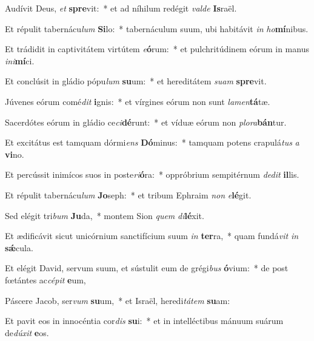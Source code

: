 \item Audívit Deus, \textit{et} \textbf{spre}vit:~* et ad níhilum redégit \textit{val}\textit{de} \textbf{Is}raël.
\item Et répulit tabernácu\textit{lum} \textbf{Si}lo:~* tabernáculum suum, ubi habitávit \textit{in} \textit{ho}\textbf{mí}nibus.
\item Et trádidit in captivitátem virtútem \textit{e}\textbf{ó}rum:~* et pulchritúdinem eórum in manus \textit{in}\textit{i}\textbf{mí}ci.
\item Et conclúsit in gládio pópu\textit{lum} \textbf{su}um:~* et hereditátem \textit{su}\textit{am} \textbf{spre}vit.
\item Júvenes eórum comé\textit{dit} \textbf{i}gnis:~* et vírgines eórum non sunt \textit{la}\textit{men}\textbf{tá}tæ.
\item Sacerdótes eórum in gládio ce\textit{ci}\textbf{dé}runt:~* et víduæ eórum non \textit{plo}\textit{ra}\textbf{bán}tur.
\item Et excitátus est tamquam dórmi\textit{ens} \textbf{Dó}minus:~* tamquam potens crapulá\textit{tus} \textit{a} \textbf{vi}no.
\item Et percússit inimícos suos in poste\textit{ri}\textbf{ó}ra:~* oppróbrium sempitérnum \textit{de}\textit{dit} \textbf{il}lis.
\item Et répulit tabernácu\textit{lum} \textbf{Jo}seph:~* et tribum Ephraim \textit{non} \textit{e}\textbf{lé}git.
\item Sed elégit tri\textit{bum} \textbf{Ju}da,~* montem Sion \textit{quem} \textit{di}\textbf{lé}xit.
\item Et ædificávit sicut unicórnium sanctifícium suum \textit{in} \textbf{ter}ra,~* quam fundá\textit{vit} \textit{in} \textbf{sǽ}cula.
\item Et elégit David, servum suum, et sústulit eum de grégi\textit{bus} \textbf{ó}vium:~* de post fœtántes ac\textit{cé}\textit{pit} \textbf{e}um,
\item Páscere Jacob, ser\textit{vum} \textbf{su}um,~* et Israël, heredi\textit{tá}\textit{tem} \textbf{su}am:
\item Et pavit eos in innocéntia cor\textit{dis} \textbf{su}i:~* et in intelléctibus mánuum suárum de\textit{dú}\textit{xit} \textbf{e}os.
